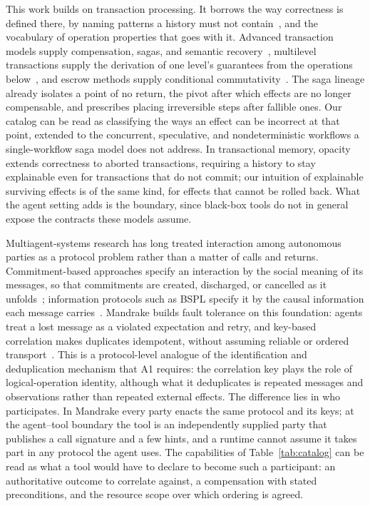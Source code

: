\documentclass[runningheads]{comsis3}
\begin{document}
This work builds on transaction processing. It borrows the way correctness
is defined there, by naming patterns a history must not
contain~\cite{berenson1995critique,adya1999}, and the vocabulary of
operation properties that goes with it. Advanced transaction models supply
compensation, sagas, and
semantic recovery~\cite{garcia1987sagas,korth1990formal,elmagarmid1992transaction,weikum2001transactional},
multilevel transactions supply the derivation of one level's guarantees
from the operations below~\cite{weikum1991principles}, and escrow methods
supply conditional commutativity~\cite{oneil1986escrow}. The saga lineage
already isolates a point of no return, the pivot after which effects are no
longer compensable, and prescribes placing irreversible steps after
fallible ones. Our catalog can be read as classifying the ways an effect
can be incorrect at that point, extended to the concurrent, speculative,
and nondeterministic workflows a single-workflow saga model does not
address. In transactional memory, opacity~\cite{guerraoui2008opacity}
extends correctness to aborted transactions, requiring a history to stay
explainable even for transactions that do not commit; our intuition of
explainable surviving effects is of the same kind, for effects that cannot
be rolled back. What the agent setting adds is the boundary, since
black-box tools do not in general expose the contracts these models assume.

Multiagent-systems research has long treated interaction among autonomous
parties as a protocol problem rather than a matter of calls and returns.
Commitment-based approaches specify an interaction by the social meaning
of its messages, so that commitments are created, discharged, or
cancelled as it unfolds~\cite{yolum2002commitment}; information protocols
such as BSPL specify it by the causal information each message
carries~\cite{singh2011bspl}. Mandrake builds fault tolerance on this
foundation: agents treat a lost message as a violated expectation and
retry, and key-based correlation makes duplicates idempotent, without
assuming reliable or ordered transport~\cite{christie2022mandrake}. This
is a protocol-level analogue of the identification and deduplication
mechanism that A1 requires: the correlation key plays the role of
logical-operation identity, although what it deduplicates is repeated
messages and observations rather than repeated external effects. The difference lies in who participates. In Mandrake every
party enacts the same protocol and its keys; at the agent--tool boundary
the tool is an independently supplied party that publishes a call
signature and a few hints, and a runtime cannot assume it takes part in
any protocol the agent uses. The capabilities of Table~\ref{tab:catalog}
can be read as what a tool would have to declare to become such a
participant: an authoritative outcome to correlate against, a compensation
with stated preconditions, and the resource scope over which ordering is
agreed.
\end{document}
